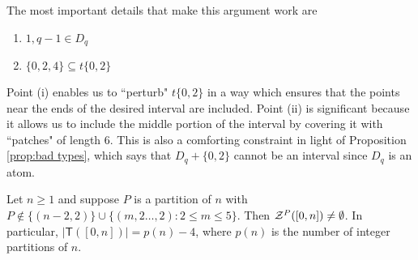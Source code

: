 \begin{rk}
	The most important details that make this argument work are
	\begin{enumerate}[label={\rm (\roman{*})}]
		\item $1,q-1\in D_q$
		\item $\{0,2,4\} \subseteq t\{0,2\}$
	\end{enumerate}
	Point (i) enables us to ``perturb" $t\{0,2\}$ in a way which ensures that the points near the ends of the desired interval are included.
	Point (ii) is significant because it allows us to include the middle portion of the interval by covering it with ``patches" of length $6$.
	This is also a comforting constraint in light of Proposition \ref{prop:bad types}, which says that $D_q + \{0,2\}$ cannot be an interval since $D_q$ is an atom.
\end{rk}


\begin{thm} \label{thm:good types}
	Let $n\ge 1$ and suppose $P$ is a partition of $n$ with $P \notin \{(n-2,2)\} \cup \{ (m,2\dots,2) : 2\le m \le 5\}$.
	Then $\mathcal{Z}^P([ 0,n ]) \neq \emptyset$.
	In particular, $|\mathsf{T}([ 0,n ])| = p(n)-4$, where $p(n)$ is the number of integer partitions of $n$.
\end{thm}

